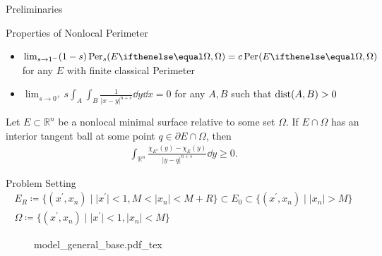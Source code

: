 \documentclass[9pt]{beamer}
\begin{document}
\begin{frame}{Preliminaries}

  \begin{block}{Properties of Nonlocal Perimeter}
    \begin{itemize}
      \item \( \lim_{s \to 1^{-}} (1-s) \Per{s}{E}{\Omega} = c \Per{}{E}{\Omega} \) for any \( E \)
        with finite classical Perimeter
      \item \( \lim_{s \to 0^{+}} s \int_{A}^{} \int_{B}^{} \frac{1}{{ \lvert x-y \rvert } ^{n+s} }  \dd{y}  \dd{x}  = 0 \) for any \( A, B \) such that \( \operatorname{dist}(A,B) > 0 \) 
    \end{itemize}
  \end{block}

  \begin{theorem}
  \label{thm:001}
    Let \( E \subset \mathbb{R}^n \) be a nonlocal minimal surface relative to some set \( \Omega \). If
    \( E \cap \Omega \) has an interior tangent ball at some point \( q \in \partial E \cap \Omega \),
    then
    \begin{gather*}
    	\int_{\mathbb{R}^n} \frac{\chi_{E^c} (y) - \chi_E (y)}{\lvert y-q \rvert^{n + s}} \dd{y} \geq 0.
    \end{gather*}
  \end{theorem}

\end{frame}

\begin{frame}{Problem Setting}
  \begin{gather*}
    E_R \coloneqq \{(x^\prime, x_n ) \mid \lvert x^\prime \rvert < 1, M < \lvert x_n \rvert < M + R \} \subset E_0 \subset \{(x^\prime, x_n) \mid \lvert x_n \rvert > M \} \\ 
    \Omega \coloneqq \{(x^\prime, x_n) \mid \lvert x^\prime \rvert < 1, \lvert x_n \rvert < M \} 
  \end{gather*}
  \begin{figure}[ht]
   \centering
    \def\svgwidth{0.8\textwidth}
    {model_general_base.pdf_tex}
   \label{fig:003}
  \end{figure}
  
\end{frame}
\end{document}
